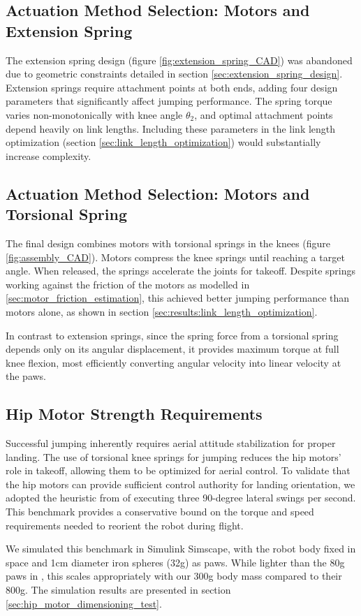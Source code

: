 \subsection{Actuation Method Selection: Motors and Extension Spring}

The extension spring design (figure \ref{fig:extension_spring_CAD}) was abandoned due to geometric constraints detailed in section \ref{sec:extension_spring_design}. Extension springs require attachment points at both ends, adding four design parameters that significantly affect jumping performance. The spring torque varies non-monotonically with knee angle $\theta_2$, and optimal attachment points depend heavily on link lengths. Including these parameters in the link length optimization (section \ref{sec:link_length_optimization}) would substantially increase complexity. 


\subsection{Actuation Method Selection: Motors and Torsional Spring}

The final design combines motors with torsional springs in the knees (figure \ref{fig:assembly_CAD}). Motors compress the knee springs until reaching a target angle. When released, the springs accelerate the joints for takeoff. Despite springs working against the friction of the motors as modelled in \ref{sec:motor_friction_estimation}, this achieved better jumping performance than motors alone, as shown in section \ref{sec:results:link_length_optimization}. 

In contrast to extension springs, since the spring force from a torsional spring depends only on its angular displacement, it provides maximum torque at full knee flexion, most efficiently converting angular velocity into linear velocity at the paws.


\subsection{Hip Motor Strength Requirements}
\label{sec:hip_motor_dimensioning_test_design}

Successful jumping inherently requires aerial attitude stabilization for proper landing. The use of torsional knee springs for jumping reduces the hip motors' role in takeoff, allowing them to be optimized for aerial control. To validate that the hip motors can provide sufficient control authority for landing orientation, we adopted the heuristic from \cite{finn_tarek_master} of executing three 90-degree lateral swings per second. This benchmark provides a conservative bound on the torque and speed requirements needed to reorient the robot during flight.

We simulated this benchmark in Simulink Simscape, with the robot body fixed in space and 1cm diameter iron spheres (32g) as paws. While lighter than the 80g paws in \cite{finn_tarek_master}, this scales appropriately with our 300g body mass compared to their 800g. The simulation results are presented in section \ref{sec:hip_motor_dimensioning_test}.